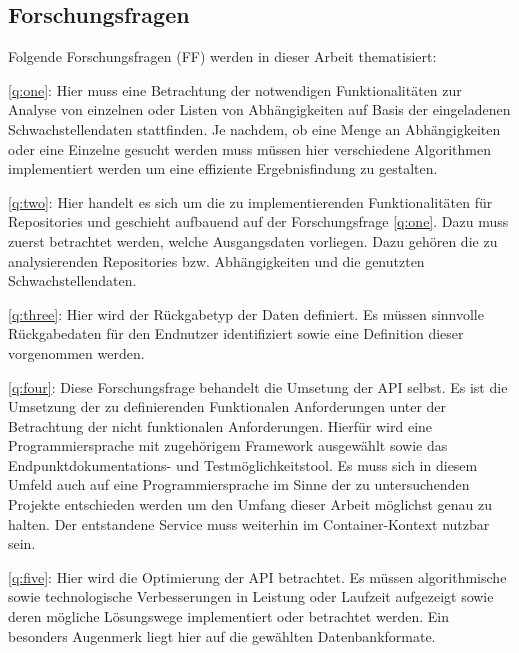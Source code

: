 \subsection{Forschungsfragen} \label{sec:Forschungsfragen}
    Folgende Forschungsfragen (FF) werden in dieser Arbeit thematisiert:

    \ref{q:one}:
    Hier muss eine Betrachtung der notwendigen Funktionalitäten zur Analyse von einzelnen oder Listen von Abhängigkeiten auf Basis der eingeladenen Schwachstellendaten stattfinden.
    Je nachdem, ob eine Menge an Abhängigkeiten oder eine Einzelne gesucht werden muss müssen hier verschiedene Algorithmen implementiert werden um eine effiziente Ergebnisfindung zu gestalten.

    \ref{q:two}:
    Hier handelt es sich um die zu implementierenden Funktionalitäten für Repositories und geschieht aufbauend auf der Forschungsfrage \ref{q:one}.
    Dazu muss zuerst betrachtet werden, welche Ausgangsdaten vorliegen.
    Dazu gehören die zu analysierenden Repositories bzw. Abhängigkeiten und die genutzten Schwachstellendaten.

    \ref{q:three}:
    Hier wird der Rückgabetyp der Daten definiert.
    Es müssen sinnvolle Rückgabedaten für den Endnutzer identifiziert sowie eine Definition dieser vorgenommen werden.

    \ref{q:four}:
    Diese Forschungsfrage behandelt die Umsetung der \ac{API} selbst.
    Es ist die Umsetzung der zu definierenden Funktionalen Anforderungen unter der Betrachtung der nicht funktionalen Anforderungen.
    Hierfür wird eine Programmiersprache mit zugehörigem Framework ausgewählt sowie das End\-punkt\-doku\-mentations- und Test\-möglich\-keits\-tool.
    Es muss sich in diesem Umfeld auch auf eine Programmiersprache im Sinne der zu untersuchenden Projekte entschieden werden um den Umfang dieser Arbeit möglichst genau zu halten.
    Der entstandene Service muss weiterhin im Container-Kontext nutzbar sein.

    \ref{q:five}:
    Hier wird die Optimierung der \ac{API} betrachtet.
    Es müssen algorithmische sowie technologische Verbesserungen in Leistung oder Laufzeit aufgezeigt sowie deren mögliche Lösungswege implementiert oder betrachtet werden.
    Ein besonders Augenmerk liegt hier auf die gewählten Datenbankformate.
